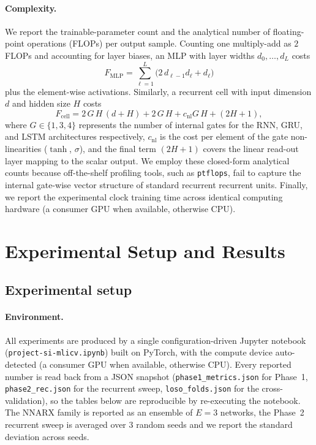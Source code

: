 \documentclass[10pt,twocolumn,letterpaper]{article}
\newcommand{\cfgdriven}{con\-fig\-u\-ra\-tion-driven}
\begin{document}
\paragraph{Complexity.}
We report the trainable-parameter count and the analytical number of 
floating-point operations (FLOPs) per output sample. Counting one 
multiply-add as $2$ FLOPs and accounting for layer biases, an MLP with 
layer widths $d_0,\dots,d_L$ costs
\begin{equation}
    F_{\text{MLP}}=\sum_{\ell=1}^{L} \big(2\,d_{\ell-1}d_\ell + d_\ell\big)
    \label{eq:flops_mlp}
\end{equation}
plus the element-wise activations. Similarly, a recurrent cell with input 
dimension $d$ and hidden size $H$ costs
\begin{equation}
    F_{\text{cell}} = 2\,G\,H\,(d+H) + 2\,G\,H + c_{\mathrm{nl}}G\,H + (2H + 1),
    \label{eq:flops_rec}
\end{equation}
where $G \in \{1,3,4\}$ represents the number of internal gates for the 
RNN, GRU, and LSTM architectures respectively, $c_{\mathrm{nl}}$ is the 
cost per element of the gate non-linearities ($\tanh$, $\sigma$), and the 
final term $(2H + 1)$ covers the linear read-out layer mapping to the scalar 
output. We employ these closed-form analytical counts because off-the-shelf 
profiling tools, such as \texttt{ptflops}, fail to capture the internal 
gate-wise vector structure of standard recurrent recurrent units. Finally, we 
report the experimental clock training time across identical computing hardware (a consumer GPU when available, otherwise CPU).

\section{Experimental Setup and Results}\label{sec:exp}

\subsection{Experimental setup}\label{sec:setup}
\paragraph{Environment.}
All experiments are produced by a single \cfgdriven{} Jupyter
notebook (\texttt{project-\allowbreak si-\allowbreak mlicv.ipynb}) built on
PyTorch, with the
compute device auto-detected (a consumer GPU when available, otherwise
CPU). Every reported number is read back from a JSON snapshot
(\texttt{phase1\_metrics.json} for Phase~1, \texttt{phase2\_rec.json} for
the recurrent sweep, \texttt{loso\_folds.json} for the cross-validation),
so the tables below are reproducible by re-executing the notebook. The
NNARX family is reported as an ensemble of $E=3$ networks, the Phase~2
recurrent sweep is averaged over $3$ random seeds and we report the
standard deviation across seeds.
\end{document}
